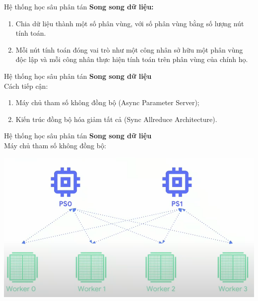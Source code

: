 \documentclass[notheorems,hyperref={bookmarks=true}]{beamer}
\theoremstyle{plain}
\numberwithin{equation}{section}
\begin{document}
\begin{footnotesize}
\begin{frame}{Hệ thống học sâu phân tán}
\textbf{Song song dữ liệu: } \pause
\begin{enumerate}[i]
	\item Chia dữ liệu thành một số phân vùng, với số phân vùng bằng số lượng nút tính toán.
	\item Mỗi nút tính toán đóng vai trò như một công nhân sở hữu một phân vùng độc lập và mỗi công nhân thực hiện tính toán trên phân vùng của chính họ.
\end{enumerate}
\end{frame}

\begin{frame}{Hệ thống học sâu phân tán}
\textbf{Song song dữ liệu } \\
Cách tiếp cận:\\
\begin{enumerate}[i]
	\item Máy chủ tham số không đồng bộ (Async Parameter Server);
	\item Kiến trúc đồng bộ hóa giảm tất cả (Sync Allreduce Architecture). 
\end{enumerate}
\end{frame}

\begin{frame}{Hệ thống học sâu phân tán}
\textbf{Song song dữ liệu } \\
Máy chủ tham số không đồng bộ:
\begin{center}
\includegraphics[scale=0.55]{Async.PNG}
\end{center}
\end{frame}



\end{footnotesize}
\end{document}
